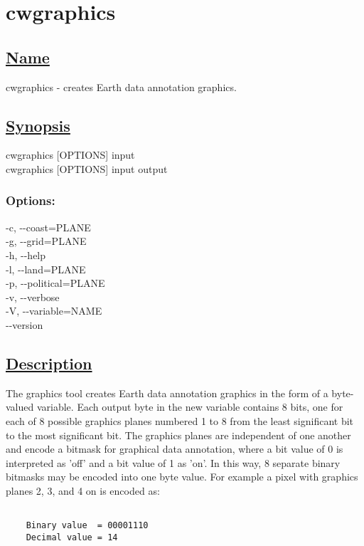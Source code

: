 \newpage
\section{cwgraphics} \hypertarget{cwgraphics}{}
\subsection*{\underline{Name}}


   cwgraphics - creates Earth data annotation graphics.  
\subsection*{\underline{Synopsis}}


  cwgraphics [OPTIONS] input \\ 
 cwgraphics [OPTIONS] input output 
\subsubsection*{Options:}


  -c, -{-}coast=PLANE \\ 
 -g, -{-}grid=PLANE \\ 
 -h, -{-}help \\ 
 -l, -{-}land=PLANE \\ 
 -p, -{-}political=PLANE \\ 
 -v, -{-}verbose \\ 
 -V, -{-}variable=NAME \\ 
 -{-}version \\ 

\subsection*{\underline{Description}}


  The graphics tool creates Earth data annotation graphics in the form of a byte-valued variable. Each output byte in the new variable contains 8 bits, one for each of 8 possible graphics planes numbered 1 to 8 from the least significant bit to the most significant bit. The graphics planes are independent of one another and encode a bitmask for graphical data annotation, where a bit value of 0 is interpreted as 'off' and a bit value of 1 as 'on'. In this way, 8 separate binary bitmasks may be encoded into one byte value. For example a pixel with graphics planes 2, 3, and 4 on is encoded as:
\begin{verbatim}

    Binary value  = 00001110
    Decimal value = 14
 
\end{verbatim}


